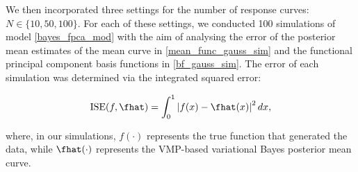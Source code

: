 \documentclass[12pt]{article}
\theoremstyle{plain}
\theoremstyle{definition}
\theoremstyle{remark}
\begin{document}
We then incorporated three settings for the number of response curves: $N \in \{ 10, 50, 100 \}$. For each of these
settings, we conducted 100 simulations of model \eqref{bayes_fpca_mod} with the aim of analysing the error of
the posterior mean estimates of the mean curve in \eqref{mean_func_gauss_sim} and the functional principal
component basis functions in \eqref{bf_gauss_sim}. The error of each simulation was determined via the
integrated squared error:

\begin{equation}
	\text{ISE} (f, \fhat) = \int_0^1 \left| f (x) - \fhat(x) \right|^2 dx,
\label{ise}
\end{equation}

\noindent where, in our simulations, $f (\cdot)$ represents the true function that generated the data, while $\fhat (\cdot)$
represents the VMP-based variational Bayes posterior mean curve.
\end{document}

